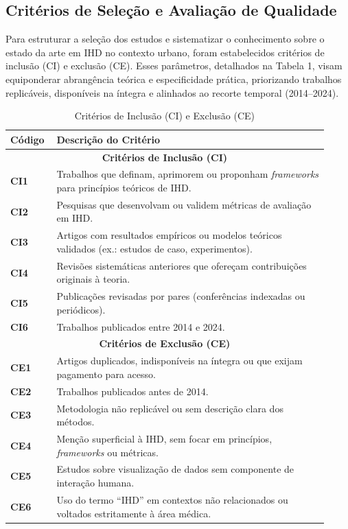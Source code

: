 \documentclass[12pt]{article}
\begin{document}
\subsection{Critérios de Seleção e Avaliação de Qualidade}

    Para estruturar a seleção dos estudos e sistematizar o conhecimento sobre o estado da arte em IHD no contexto urbano, foram estabelecidos critérios de inclusão (CI) e exclusão (CE). Esses parâmetros, detalhados na Tabela 1, visam equiponderar abrangência teórica e especificidade prática, priorizando trabalhos replicáveis, disponíveis na íntegra e alinhados ao recorte temporal (2014–2024).

\begin{table}[H]
\centering
\caption{Critérios de Inclusão (CI) e Exclusão (CE)}
\label{tab:criterios}
\small
\begin{tabular}{p{0.12\linewidth} p{0.8\linewidth}}
\hline
\textbf{Código} & \textbf{Descrição do Critério} \\ 
\hline
\multicolumn{2}{c}{\textbf{Critérios de Inclusão (CI)}} \\ 
\hline
\textbf{CI1} & Trabalhos que definam, aprimorem ou proponham \textit{frameworks} para princípios teóricos de IHD. \\ 
\textbf{CI2} & Pesquisas que desenvolvam ou validem métricas de avaliação em IHD. \\ 
\textbf{CI3} & Artigos com resultados empíricos ou modelos teóricos validados (ex.: estudos de caso, experimentos). \\ 
\textbf{CI4} & Revisões sistemáticas anteriores que ofereçam contribuições originais à teoria. \\ 
\textbf{CI5} & Publicações revisadas por pares (conferências indexadas ou periódicos). \\ 
\textbf{CI6} & Trabalhos publicados entre 2014 e 2024. \\ 
\hline
\multicolumn{2}{c}{\textbf{Critérios de Exclusão (CE)}} \\ 
\hline
\textbf{CE1} & Artigos duplicados, indisponíveis na íntegra ou que exijam pagamento para acesso. \\ 
\textbf{CE2} & Trabalhos publicados antes de 2014. \\ 
\textbf{CE3} & Metodologia não replicável ou sem descrição clara dos métodos. \\ 
\textbf{CE4} & Menção superficial à IHD, sem focar em princípios, \textit{frameworks} ou métricas. \\ 
\textbf{CE5} & Estudos sobre visualização de dados sem componente de interação humana. \\ 
\textbf{CE6} & Uso do termo ``IHD'' em contextos não relacionados ou voltados estritamente à área médica. \\ 
\hline
\end{tabular}
\end{table}
\end{document}
